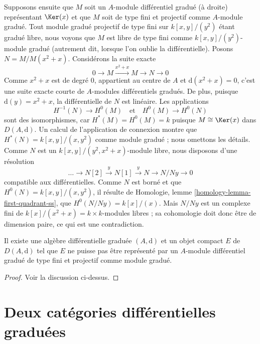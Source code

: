 \medskip\noindent
Supposons ensuite que $M$ soit un $A$-module différentiel gradué (à droite)
représentant $\Ker(x)$ et que $M$ soit de type fini et projectif
comme $A$-module gradué. Tout module gradué projectif de type fini
sur $k[x, y]/(y^2)$ étant gradué libre, nous voyons que $M$ est
libre de type fini comme $k[x, y]/(y^2)$-module gradué (autrement dit,
lorsque l'on oublie la différentielle). Posons $N = M/M(x^2 + x)$.
Considérons la suite exacte
$$
0 \to M \xrightarrow{x^2 + x} M \to N \to 0
$$
Comme $x^2 + x$ est de degré $0$, appartient au centre de $A$ et
$\text{d}(x^2 + x) = 0$, c'est une suite exacte courte de
$A$-modules différentiels gradués. De plus, puisque $\text{d}(y) = x^2 + x$,
la différentielle de $N$ est linéaire. Les applications
$$
H^{-1}(N) \to H^0(M)
\quad\text{et}\quad
H^0(M) \to H^0(N)
$$
sont des isomorphismes, car $H^*(M) = H^0(M) = k$ puisque $M \cong \Ker(x)$
dans $D(A, \text{d})$. Un calcul de l'application de connexion montre que
$H^*(N) = k[x, y]/(x, y^2)$ comme module gradué ; nous omettons
les détails. Comme $N$ est un $k[x, y]/(y^2, x^2 + x)$-module libre,
nous disposons d'une résolution
$$
\ldots \to N[2] \xrightarrow{y} N[1] \xrightarrow{y} N \to N/Ny \to 0
$$
compatible aux différentielles. Comme $N$ est borné et que
$H^0(N) = k[x,y]/(x, y^2)$, il résulte de
Homologie, lemme \ref{homology-lemma-first-quadrant-ss},
que $H^0(N/Ny) = k[x]/(x)$. Mais $N/Ny$ est un complexe fini de
$k[x]/(x^2 + x) = k \times k$-modules libres ; sa cohomologie
doit donc être de dimension paire, ce qui est une contradiction.

\begin{lemma}
\label{lemma-no-good-representatif-compact-object}
Il existe une algèbre différentielle graduée $(A, \text{d})$ et un objet
compact $E$ de $D(A, \text{d})$ tel que $E$ ne puisse pas
être représenté par un $A$-module différentiel gradué de type fini et
projectif comme module gradué.
\end{lemma}

\begin{proof}
Voir la discussion ci-dessus.
\end{proof}







\section{Deux catégories différentielles graduées}
\label{section-nongraded-differential-graded}

